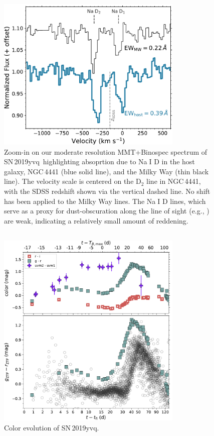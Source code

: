 \documentclass[twocolumn]{aastex63}
\def\ion#1#2{#1$\;${\footnotesize\rm{#2}}\relax}
\newcommand{\sn}{SN\,2019yvq}
\begin{document}
\begin{figure}
    \centering
    \includegraphics[width=3.5in]{./figures/NaD.pdf}
    \caption{Zoom-in on our moderate resolution MMT+Binospec spectrum of \sn\
    highlighting absoprtion due to \ion{Na}{I} D in the host galaxy,
    NGC\,4441 (blue solid line), and the Milky Way (thin black line). The
    velocity scale is centered on the D$_2$ line in NGC\,4441, with the SDSS
    redshift shown via the vertical dashed line. No shift has been applied to
    the Milky Way lines. The \ion{Na}{I} D lines, which serve as a proxy for
    dust-obscuration along the line of sight (e.g.,
    \citep{Poznanski12,Phillips13}) are weak, indicating a relatively small
    amount of reddening. }
    \label{fig:NaD}
\end{figure}

\subsection{}


\begin{figure}
    \centering
    \includegraphics[width=3.5in]{./figures/P48_colors.pdf}
    \caption{Color evolution of \sn.}
    \label{fig:colors}
\end{figure}
\end{document}
